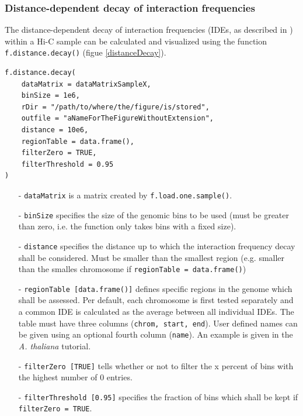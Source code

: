 \documentclass[a4paper,10pt]{article}
\begin{document}
\subsubsection{Distance-dependent decay of interaction frequencies}
The distance-dependent decay of interaction frequencies (IDEs, as described in \cite{2009_LiebermanAiden}) within a Hi-C sample can be calculated and visualized using the function \texttt{f.distance.decay()} (figue \ref{distanceDecay}).
\begin{verbatim}
f.distance.decay(
    dataMatrix = dataMatrixSampleX,
    binSize = 1e6,
    rDir = "/path/to/where/the/figure/is/stored",
    outfile = "aNameForTheFigureWithoutExtension",
    distance = 10e6,
    regionTable = data.frame(),
    filterZero = TRUE,
    filterThreshold = 0.95
)
\end{verbatim}
\begin{itemize}
 \item[-] \texttt{dataMatrix} is a matrix created by \texttt{f.load.one.sample()}.
 \item[-] \texttt{binSize} specifies the size of the genomic bins to be used (must be greater than zero, i.e. the function only takes bins with a fixed size).
 \item[-] \texttt{distance} specifies the distance up to which the interaction frequency decay shall be considered. Must be smaller than the smallest region (e.g. smaller than the smalles chromosome if \texttt{regionTable = data.frame()})
 \item[-] \texttt{regionTable [data.frame()]} defines specific regions in the genome which shall be assessed. Per default, each chromosome is first tested separately and a common IDE is calculated as the average between all individual IDEs. The table must have three columns (\texttt{chrom, start, end}). User defined names can be given using an optional fourth column (\texttt{name}). An example is given in the \textit{A. thaliana} tutorial.
 \item[-] \texttt{filterZero [TRUE]} tells whether or not to filter the x percent of bins with the highest number of 0 entries.
 \item[-] \texttt{filterThreshold [0.95]} specifies the fraction of bins which shall be kept if \texttt{filterZero = TRUE}.
\end{itemize}
\clearpage
\end{document}
